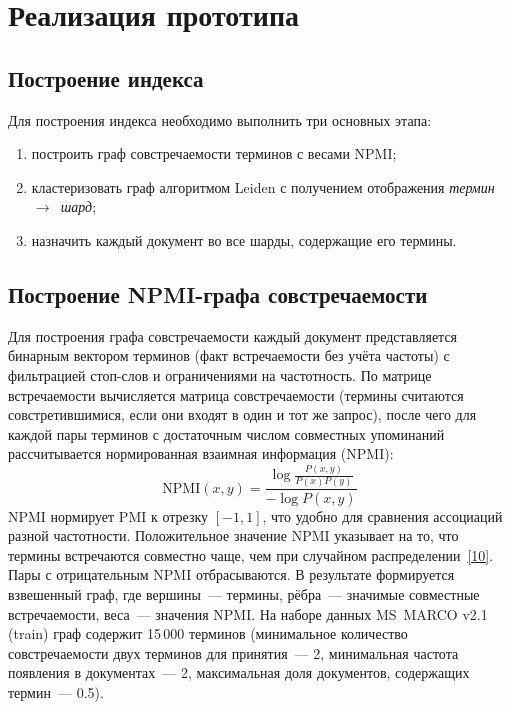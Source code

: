 \documentclass[14pt, a4paper]{article}
\newcommand{\srcref}[1]{\hyperlink{src:i#1}{[#1]}}
\begin{document}
	\section{Реализация прототипа}

	\subsection{Построение индекса}

	Для построения индекса необходимо выполнить три основных этапа:
	\begin{enumerate}
		\item построить граф совстречаемости терминов с весами NPMI;
		\item кластеризовать граф алгоритмом Leiden с получением отображения \textit{термин~$\to$~шард};
		\item назначить каждый документ во все шарды, содержащие его термины.
	\end{enumerate}

	\subsection{Построение NPMI-графа совстречаемости}

	Для построения графа совстречаемости каждый документ представляется бинарным вектором терминов (факт встречаемости без учёта частоты) с фильтрацией стоп-слов и ограничениями на частотность.
	По матрице встречаемости вычисляется матрица совстречаемости (термины считаются совстретившимися, если они входят в один и тот же запрос), после чего для каждой пары терминов с достаточным числом совместных упоминаний рассчитывается нормированная взаимная информация (NPMI):
	\begin{equation}
		\mathrm{NPMI}(x,y) = \frac{\log\frac{P(x,y)}{P(x)P(y)}}{-\log P(x,y)}
	\end{equation}
	NPMI нормирует PMI к отрезку $[-1, 1]$, что удобно для сравнения ассоциаций разной частотности.
	Положительное значение NPMI указывает на то, что термины встречаются совместно чаще, чем при случайном распределении~\srcref{10}.
	Пары с отрицательным NPMI отбрасываются.
	В результате формируется взвешенный граф, где вершины~--- термины, рёбра~--- значимые совместные встречаемости, веса~--- значения NPMI.
	На наборе данных MS~MARCO v2.1 (train) граф содержит 15\,000 терминов (минимальное количество совстречаемости двух терминов для принятия~--- 2, минимальная частота появления в документах~--- 2, максимальная доля документов, содержащих термин~--- 0.5).
\end{document}
